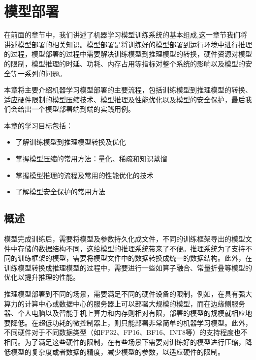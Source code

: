 \documentclass[letterpaper,10pt,english]{sphinxmanual}
\begin{document}
\chapter{模型部署}
\label{\detokenize{chapter_model_deployment/index:id1}}\label{\detokenize{chapter_model_deployment/index::doc}}
\sphinxAtStartPar
在前面的章节中，我们讲述了机器学习模型训练系统的基本组成,这一章节我们将讲述模型部署的相关知识。模型部署是将训练好的模型部署到运行环境中进行推理的过程，模型部署的过程中需要解决训练模型到推理模型的转换，硬件资源对模型的限制，模型推理的时延、功耗、内存占用等指标对整个系统的影响以及模型的安全等一系列的问题。

\sphinxAtStartPar
本章将主要介绍机器学习模型部署的主要流程，包括训练模型到推理模型的转换、适应硬件限制的模型压缩技术、模型推理及性能优化以及模型的安全保护，最后我们会给出一个模型部署端到端的实践用例。

\sphinxAtStartPar
本章的学习目标包括：
\begin{itemize}
\item {} 
\sphinxAtStartPar
了解训练模型到推理模型转换及优化

\item {} 
\sphinxAtStartPar
掌握模型压缩的常用方法：量化、稀疏和知识蒸馏

\item {} 
\sphinxAtStartPar
掌握模型推理的流程及常用的性能优化的技术

\item {} 
\sphinxAtStartPar
了解模型安全保护的常用方法

\end{itemize}


\section{概述}
\label{\detokenize{chapter_model_deployment/model_deployment_introduction:id1}}\label{\detokenize{chapter_model_deployment/model_deployment_introduction::doc}}
\sphinxAtStartPar
模型完成训练后，需要将模型及参数持久化成文件，不同的训练框架导出的模型文件中存储的数据结构不同，这给模型的推理系统带来了不便。推理系统为了支持不同的训练框架的模型，需要将模型文件中的数据转换成统一的数据结构。此外，在训练模型转换成推理模型的过程中，需要进行一些如算子融合、常量折叠等模型的优化以提升推理的性能。

\sphinxAtStartPar
推理模型部署到不同的场景，需要满足不同的硬件设备的限制，例如，在具有强大算力的计算中心或数据中心的服务器上可以部署大规模的模型，而在边缘侧服务器、个人电脑以及智能手机上算力和内存则相对有限，部署的模型的规模就相应地要降低。在超低功耗的微控制器上，则只能部署非常简单的机器学习模型。此外，不同硬件对于不同数据类型（如FP32、FP16、BF16、INT8等）的支持程度也不相同。为了满足这些硬件的限制，在有些场景下需要对训练好的模型进行压缩，降低模型的复杂度或者数据的精度，减少模型的参数，以适应硬件的限制。
\end{document}
